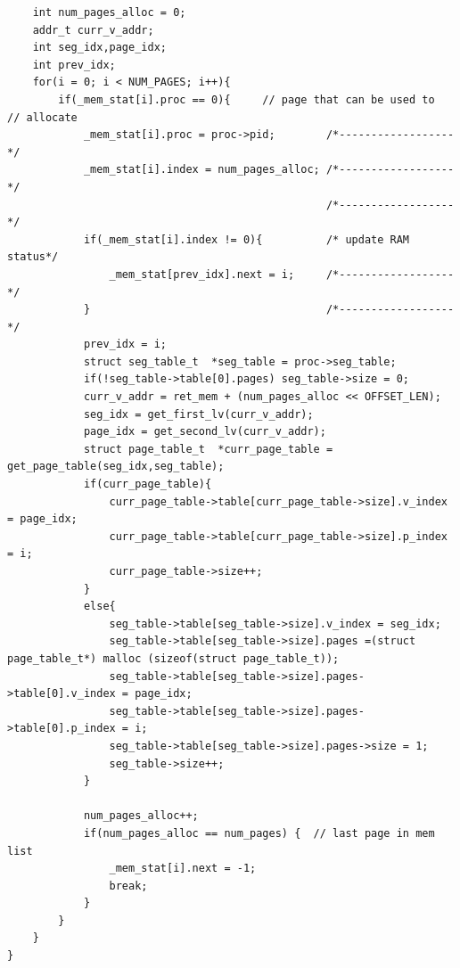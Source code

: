 \documentclass[a4paper]{article}
\begin{document}
	\begin{lstlisting}
	int num_pages_alloc = 0;
	addr_t curr_v_addr;
	int seg_idx,page_idx;
	int prev_idx;                       
	for(i = 0; i < NUM_PAGES; i++){
		if(_mem_stat[i].proc == 0){     // page that can be used to                                      // allocate
			_mem_stat[i].proc = proc->pid;        /*------------------*/ 
			_mem_stat[i].index = num_pages_alloc; /*------------------*/
			                                      /*------------------*/
			if(_mem_stat[i].index != 0){          /* update RAM status*/
				_mem_stat[prev_idx].next = i;     /*------------------*/
			}                                     /*------------------*/
			prev_idx = i;
			struct seg_table_t  *seg_table = proc->seg_table;
			if(!seg_table->table[0].pages) seg_table->size = 0;
			curr_v_addr = ret_mem + (num_pages_alloc << OFFSET_LEN);
			seg_idx = get_first_lv(curr_v_addr);  
			page_idx = get_second_lv(curr_v_addr);
			struct page_table_t  *curr_page_table = get_page_table(seg_idx,seg_table); 
			if(curr_page_table){  
				curr_page_table->table[curr_page_table->size].v_index = page_idx; 
				curr_page_table->table[curr_page_table->size].p_index = i;
				curr_page_table->size++;	
			}
			else{               
				seg_table->table[seg_table->size].v_index = seg_idx;
				seg_table->table[seg_table->size].pages =(struct page_table_t*) malloc (sizeof(struct page_table_t));
				seg_table->table[seg_table->size].pages->table[0].v_index = page_idx;
				seg_table->table[seg_table->size].pages->table[0].p_index = i;
				seg_table->table[seg_table->size].pages->size = 1;
				seg_table->size++;
			}
				
			num_pages_alloc++;
			if(num_pages_alloc == num_pages) {  // last page in mem list
				_mem_stat[i].next = -1;
				break;
			}
		}
	}
}
	\end{lstlisting}
\end{document}
